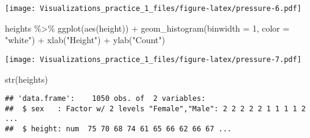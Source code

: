 \documentclass[
]{article}
\newenvironment{Shaded}{\begin{snugshade}}{\end{snugshade}}
\newcommand{\AttributeTok}[1]{\textcolor[rgb]{0.77,0.63,0.00}{#1}}
\newcommand{\DecValTok}[1]{\textcolor[rgb]{0.00,0.00,0.81}{#1}}
\newcommand{\FunctionTok}[1]{\textcolor[rgb]{0.00,0.00,0.00}{#1}}
\newcommand{\NormalTok}[1]{#1}
\newcommand{\SpecialCharTok}[1]{\textcolor[rgb]{0.00,0.00,0.00}{#1}}
\newcommand{\StringTok}[1]{\textcolor[rgb]{0.31,0.60,0.02}{#1}}
\begin{document}
\texttt{[image: Visualizations\_practice\_1\_files/figure-latex/pressure-6.pdf]}

\begin{Shaded}
\begin{Highlighting}[]
\NormalTok{heights }\SpecialCharTok{\%\textgreater{}\%} 
  \FunctionTok{ggplot}\NormalTok{(}\FunctionTok{aes}\NormalTok{(height)) }\SpecialCharTok{+} 
  \FunctionTok{geom\_histogram}\NormalTok{(}\AttributeTok{binwidth =} \DecValTok{1}\NormalTok{, }\AttributeTok{color =} \StringTok{"white"}\NormalTok{) }\SpecialCharTok{+} 
  \FunctionTok{xlab}\NormalTok{(}\StringTok{"Height"}\NormalTok{) }\SpecialCharTok{+} \FunctionTok{ylab}\NormalTok{(}\StringTok{"Count"}\NormalTok{)}
\end{Highlighting}
\end{Shaded}

\texttt{[image: Visualizations\_practice\_1\_files/figure-latex/pressure-7.pdf]}

\begin{Shaded}
\begin{Highlighting}[]
\FunctionTok{str}\NormalTok{(heights)}
\end{Highlighting}
\end{Shaded}

\begin{verbatim}
## 'data.frame':    1050 obs. of  2 variables:
##  $ sex   : Factor w/ 2 levels "Female","Male": 2 2 2 2 2 1 1 1 1 2 ...
##  $ height: num  75 70 68 74 61 65 66 62 66 67 ...
\end{verbatim}
\end{document}
